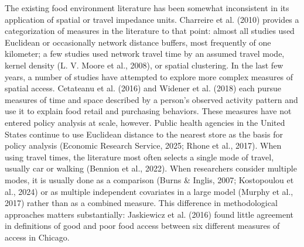 \documentclass[
  letterpaper,
  number,
  review,
  3p]{elsarticle}
\begin{document}
The existing food environment literature has been somewhat inconsistent
in its application of spatial or travel impedance units. Charreire et
al. (2010) provides a categorization of measures in the literature to
that point: almost all studies used Euclidean or occasionally network
distance buffers, most frequently of one kilometer; a few studies used
network travel time by an assumed travel mode, kernel density (L. V.
Moore et al., 2008), or spatial clustering. In the last few years, a
number of studies have attempted to explore more complex measures of
spatial access. Cetateanu et al. (2016) and Widener et al. (2018) each
pursue measures of time and space described by a person's observed
activity pattern and use it to explain food retail and purchasing
behaviors. These measures have not entered policy analysis at scale,
however. Public health agencies in the United States continue to use
Euclidean distance to the nearest store as the basis for policy analysis
(Economic Research Service, 2025; Rhone et al., 2017). When using travel
times, the literature most often selects a single mode of travel,
usually car or walking (Bennion et al., 2022). When researchers consider
multiple modes, it is usually done as a comparison (Burns \& Inglis,
2007; Kostopoulou et al., 2024) or as multiple independent covariates in
a large model (Murphy et al., 2017) rather than as a combined measure.
This difference in methodological approaches matters substantially:
Jaskiewicz et al. (2016) found little agreement in definitions of good
and poor food access between six different measures of access in
Chicago.
\end{document}
